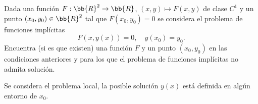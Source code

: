 \documentclass[12pt]{article}
\begin{document}
    \begin{ejercicio}
        Dada una función $F : \bb{R}^2 \to \bb{R}$, $(x, y) \mapsto F(x, y)$ de clase $C^1$ y un punto $(x_0, y_0) \in \bb{R}^2$ tal que $F(x_0, y_0) = 0$ se considera el problema de funciones implícitas
        \begin{equation*}
            F(x, y(x)) = 0, \quad y(x_0) = y_0.
        \end{equation*}
        Encuentra (si es que existen) una función $F$ y un punto $(x_0, y_0)$ en las condiciones anteriores y para los que el problema de funciones implícitas no admita solución.
        \begin{observacion}
            Se considera el problema local, la posible solución $y(x)$ está definida en algún entorno de $x_0$.
        \end{observacion}

    \end{ejercicio}
\end{document}
